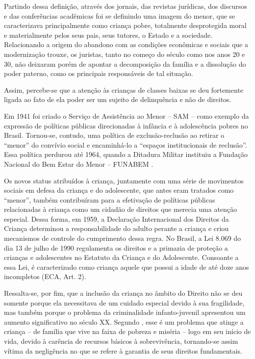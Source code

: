 \begin{citacao}
	Partindo dessa definição, através dos jornais, das revistas jurídicas, dos discursos e das conferências acadêmicas foi se definindo uma imagem do menor, que se caracterizava principalmente como criança pobre, totalmente desprotegida moral e materialmente pelos seus pais, seus tutores, o Estado e a sociedade. Relacionando a origem do abandono com as condições econômicas e sociais que a modernização trouxe, os juristas, tanto no começo do século como nos anos 20 e 30, não deixaram porém de apontar a decomposição da família e a dissolução do poder paterno, como os principais responsáveis de tal situação.
\end{citacao}

Assim, percebe-se que a atenção às crianças de classes baixas se deu fortemente ligada ao fato de ela poder ser um sujeito de delinquência e não de direitos.

Em 1941 foi criado o Serviço de Assistência ao Menor -- SAM -- como exemplo da expressão de políticas públicas direcionadas à infância e à adolescência pobres no Brasil. Tornou-se, contudo, uma política de exclusão-reclusão ao retirar o ``menor'' do convívio social e encaminhá-lo a ``espaços institucionais de reclusão''. Essa política perdurou até 1964, quando a Ditadura Militar instituiu a Fundação Nacional do Bem Estar do Menor -- FUNABEM \cite[p. 54]{VASCONCELOS2002}.

Os novos status atribuídos à criança, juntamente com uma série de movimentos sociais em defesa da criança e do adolescente, que antes eram tratados como ``menor'', também contribuíram para a efetivação de políticas públicas relacionadas à criança como um cidadão de direitos que merecia uma atenção especial. Dessa forma, em 1959, a Declaração Internacional dos Direitos da Criança determinou a responsabilidade do adulto perante a criança e criou mecanismos de controle do cumprimento dessa regra. No Brasil, a Lei 8.069 do dia 13 de julho de 1990 regulamenta os direitos e a primazia de proteção a crianças e adolescentes no Estatuto da Criança e do Adolescente. Consoante a essa Lei, é caracterizado como criança aquele que possui a idade de até doze anos incompletos (ECA, Art. 2\textordmasculine).

Ressalta-se, por fim, que a inclusão da criança no âmbito do Direito não se deu somente porque ela necessitava de um cuidado especial devido à sua fragilidade, mas também porque o problema da criminalidade infanto-juvenil apresentou um aumento significativo no século XX. Segundo , esse é um problema que atinge a criança -- de família que vive na faixa de pobreza e miséria -- logo em seu início de vida, devido à carência de recursos básicos à sobrevivência, tornando-se assim vítima da negligência no que se refere à garantia de seus direitos fundamentais. 

